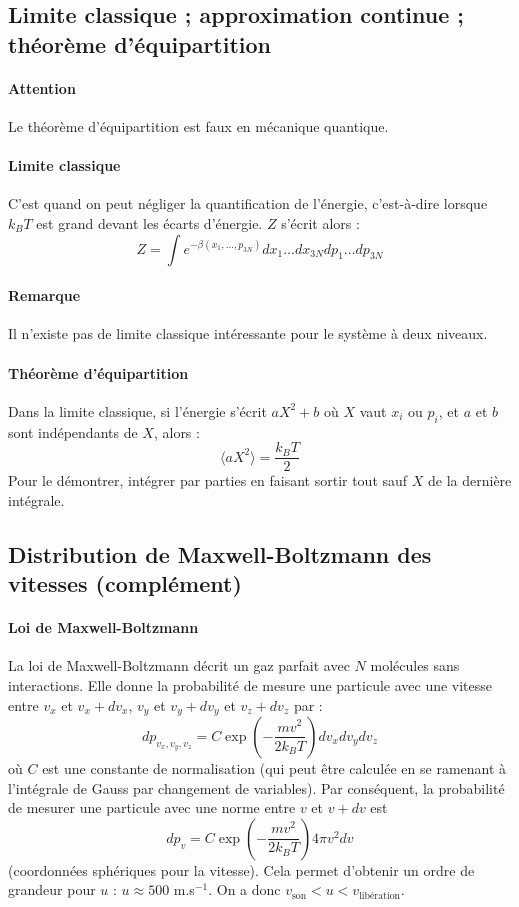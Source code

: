 \documentclass[french]{book}
\theoremstyle{plain}
\theoremstyle{definition}
\theoremstyle{remark}
\newcommand{\inv}{^{-1}}
\begin{document}
\subsection{Limite classique ; approximation continue ; théorème d'équipartition}

\paragraph{Attention} Le théorème d'équipartition est faux en mécanique quantique.

\paragraph{Limite classique} C'est quand on peut négliger la quantification de l'énergie, c'est-à-dire lorsque $k_BT$ est grand devant les écarts d'énergie. $Z$ s'écrit alors : $$Z=\int e^{-\beta(x_1,\ldots,p_{3N})}dx_1\ldots dx_{3N}dp_1\ldots dp_{3N}$$

\paragraph{Remarque} Il n'existe pas de limite classique intéressante pour le système à deux niveaux.

\paragraph{Théorème d'équipartition} Dans la limite classique, si l'énergie s'écrit $aX^2+b$ où $X$ vaut $x_i$ ou $p_i$, et $a$ et $b$ sont indépendants de $X$, alors : $$\langle aX^2\rangle=\frac{k_BT}{2}$$ Pour le démontrer, intégrer par parties  en faisant sortir tout sauf $X$ de la dernière intégrale.
\subsection{Distribution de Maxwell-Boltzmann des vitesses (complément)}
\paragraph{Loi de Maxwell-Boltzmann} La loi de Maxwell-Boltzmann décrit un gaz parfait avec $N$ molécules sans interactions. Elle donne la probabilité de mesure une particule avec une vitesse entre $v_x$ et $v_x+dv_x$, $v_y$ et $v_y+dv_y$ et $v_z+dv_z$ par : $$dp_{v_x,v_y,v_z}=C\exp\left(-\frac{mv^2}{2k_BT}\right)dv_xdv_ydv_z$$ où $C$ est une constante de normalisation (qui peut être calculée en se ramenant à l'intégrale de Gauss par changement de variables). Par conséquent, la probabilité de mesurer une particule avec une norme entre $v$ et $v+dv$  est $$dp_v=C\exp\left(-\frac{mv^2}{2k_BT}\right)4\pi v^2dv$$ (coordonnées sphériques pour la vitesse). Cela permet d'obtenir un ordre de grandeur pour $u$ : $u\approx 500$ m.s$\inv$. On a donc $v_\text{son}<u<v_\text{libération}$.
\end{document}
